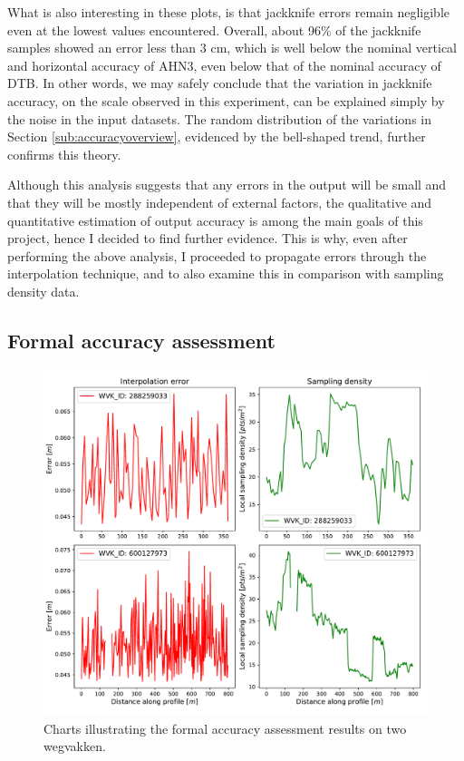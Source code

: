What is also interesting in these plots, is that jackknife errors remain negligible even at the lowest values encountered. Overall, about 96\% of the jackknife samples showed an error less than 3 cm, which is well below the nominal vertical and horizontal accuracy of AHN3, even below that of the nominal accuracy of DTB. In other words, we may safely conclude that the variation in jackknife accuracy, on the scale observed in this experiment, can be explained simply by the noise in the input datasets. The random distribution of the variations in Section \ref{sub:accuracyoverview}, evidenced by the bell-shaped trend, further confirms this theory.

Although this analysis suggests that any errors in the output will be small and that they will be mostly independent of external factors, the qualitative and quantitative estimation of output accuracy is among the main goals of this project, hence I decided to find further evidence. This is why, even after performing the above analysis, I proceeded to propagate errors through the interpolation technique, and to also examine this in comparison with sampling density data.

\subsection{Formal accuracy assessment}
\label{sub:accuracyformal}

\begin{figure}
    \centering
    \includegraphics[width=0.9\linewidth]{final_report/figs/formalaccuracy0.pdf}
    \caption{Charts illustrating the formal accuracy assessment results on two wegvakken.}
    \label{fig:formalaccuracy0}
\end{figure}

